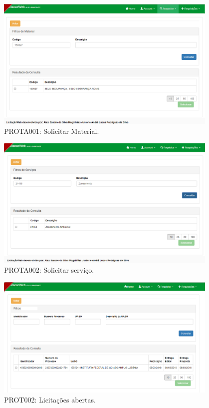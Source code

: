 \begin{anexosenv}
\begin{figure}[htbp]
    \centering
    \includegraphics[width=0.95\textwidth]{figuras/prototipoA001.png}
    \caption[PROTA001]{PROTA001: Solicitar Material.}
    \label{PROTA001}
\end{figure}

\begin{figure}[htbp]
    \centering   
    \includegraphics[width=0.95\textwidth]{figuras/prototipoA002.png}
    \caption[PROTA002]{PROTA002: Solicitar serviço.}
    \label{PROTA002}
\end{figure}

\begin{figure}[htbp]
    \centering
    \includegraphics[width=0.95\textwidth]{figuras/prototipo002.png}
    \caption[PROT002]{PROT002: Licitações abertas.}
    \label{PROT002}
\end{figure}


\end{anexosenv}
